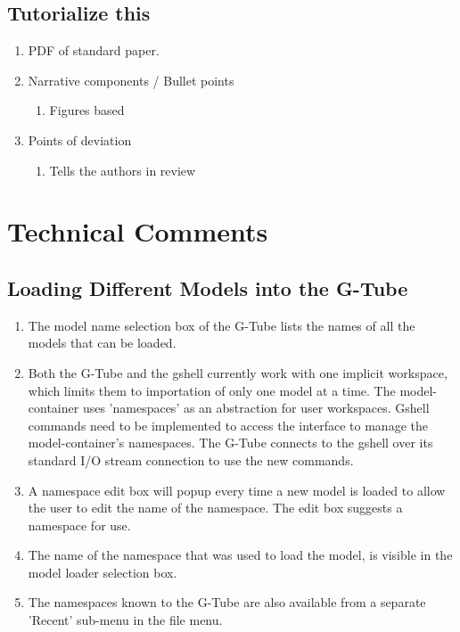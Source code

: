 \documentclass[12pt]{article}
\begin{document}
\subsection{Tutorialize this}

\begin{enumerate}
\item PDF of standard paper.
\item Narrative components / Bullet points
  \begin{enumerate}
  \item Figures based
  \end{enumerate}
\item Points of deviation
  \begin{enumerate}
  \item Tells the authors in review
  \end{enumerate}
\end{enumerate}


\section{Technical Comments}

\subsection{Loading Different Models into the G-Tube}

\begin{enumerate}
\item The model name selection box of the G-Tube lists the names of
  all the models that can be loaded.
\item Both the G-Tube and the gshell currently work with one implicit
  workspace, which limits them to importation of only one model at a
  time.  The model-container uses 'namespaces' as an abstraction for
  user workspaces.  Gshell commands need to be implemented to access
  the interface to manage the model-container's namespaces.  The
  G-Tube connects to the gshell over its standard I/O stream
  connection to use the new commands.
\item A namespace edit box will popup every time a new model is loaded
  to allow the user to edit the name of the namespace.  The edit box
  suggests a namespace for use.
\item The name of the namespace that was used to load the model, is
  visible in the model loader selection box.
\item The namespaces known to the G-Tube are also available from a
  separate 'Recent' sub-menu in the file menu.
\end{enumerate}
\end{document}
